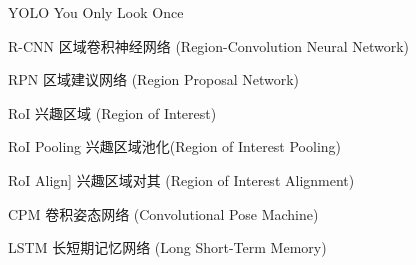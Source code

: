 \begin{denotation}[3cm]
\item[YOLO] You Only Look Once\cite{redmon2016you}
\item[R-CNN] 区域卷积神经网络 (Region-Convolution Neural Network)
\item[RPN] 区域建议网络 (Region Proposal Network)
\item[RoI] 兴趣区域 (Region of Interest)
\item[RoI Pooling] 兴趣区域池化(Region of Interest Pooling)
\item[]RoI Align] 兴趣区域对其 (Region of Interest Alignment)
\item[CPM] 卷积姿态网络 (Convolutional Pose Machine)
\item[LSTM] 长短期记忆网络 (Long Short-Term Memory)
\end{denotation}
